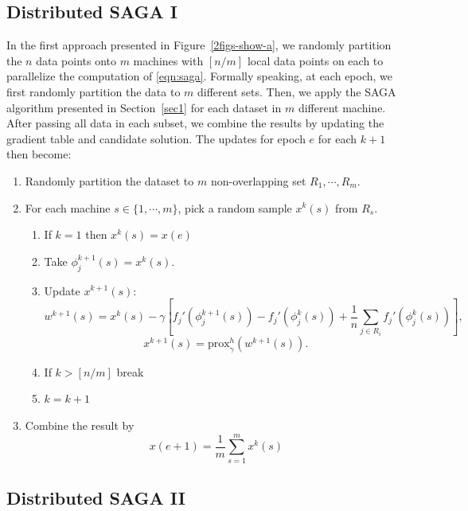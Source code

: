 \documentclass[a4paper,11pt]{article}
\newcommand{\prox}{\textrm{prox}}
\begin{document}
\subsection{Distributed SAGA I}
In the first approach presented in Figure~\ref{2figs-show-a}, we randomly partition the $n$ data points onto $m$ machines with $[n/m]$ local data points on each to parallelize the computation of \eqref{eqn:saga}. Formally speaking, at each epoch, we first randomly partition the data to $m$ different sets. Then, we apply the SAGA algorithm presented in Section~\ref{sec1} for each dataset in $m$ different machine. After passing all data in each subset, we combine the results by updating the gradient table and candidate solution. The updates for epoch $e$ for each $k+1$ then become:
\begin{enumerate}
	\item Randomly partition the dataset to $m$ non-overlapping set $R_1, \cdots, R_m$.
	\item For each machine $s \in \{ 1, \cdots, m \}$, pick a random sample $x^k(s)$ from $R_s$.
	\begin{enumerate}
		\item If $ k = 1 $ then $x^k(s) = x(e)$
		\item Take $\phi_j^{k+1}(s) = x^k(s)$.
		\item Update $x^{k+1}(s)$:
		\begin{equation} \label{eqn:distsaga1}
			w^{k+1}(s) = x^k(s) - \gamma \left[ f_j'(\phi_j^{k+1}(s)) - f_j'(\phi_j^k(s))
			+ \frac1n \sum_{j \in R_i} f_j'(\phi_j^k(s)) \right] ,
		\end{equation}
		$$x^{k+1}(s) = \prox_\gamma^h (w^{k+1}(s)).$$
		\item If $ k > [n/m]$ break
		\item $k = k+1$
	\end{enumerate}	
	\item Combine the result by
	$$ x(e+1) = \frac{1}{m} \sum_{s=1}^m x^k(s) $$
\end{enumerate}

\subsection{Distributed SAGA II}
\end{document}

